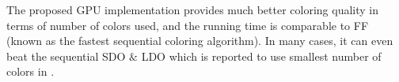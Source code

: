 \documentclass[preprint]{sigplanconf}
\begin{document}
The proposed GPU implementation provides much better coloring quality in terms of number of colors used, and the running time is comparable to FF (known as the fastest sequential coloring algorithm). In many cases, it can even beat the sequential SDO $\&$ LDO which is reported to use smallest number of colors in \cite{bozdag2008a}.


%
%
%











\end{document}
